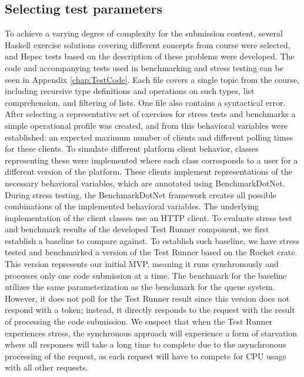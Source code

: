 \subsection{Selecting test parameters}
To achieve a varying degree of complexity for the submission content, several Haskell exercise solutions covering different concepts from course were selected, and Hspec tests based on the description of these problems were developed. 
The code and accompanying tests used in benchmarking and stress testing can be seen in Appendix \ref{chap:TestCode}.
Each file covers a single topic from the course, including recursive type definitions and operations on such types, list comprehension, and filtering of lists. 
One file also contains a syntactical error.
After selecting a representative set of exercises for stress tests and benchmarks a simple operational profile was created, and from this behavioral variables were established: an expected maximum number of clients and different polling times for these clients.
To simulate different platform client behavior, classes representing these were implemented where each class corresponds to a user for a different version of the platform.
These clients implement representations of the necessary behavioral variables, which are annotated using BenchmarkDotNet.
During stress testing, the BenchmarkDotNet framework creates all possible combinations of the implemented behavioral variables.
The underlying implementation of the client classes use an HTTP client.
To evaluate stress test and benchmark results of the developed Test Runner component, we first establish a baseline to compare against.
To establish such baseline, we have stress tested and benchmarked a version of the Test Runner based on the Rocket crate.
This version represents our initial MVP, meaning it runs synchronously and processes only one code submission at a time.
The benchmark for the baseline utilizes the same parameterization as the benchmark for the queue system.
However, it does not poll for the Test Runner result since this version does not respond with a token; instead, it directly responds to the request with the result of processing the code submission.
We suspect that when the Test Runner experiences stress, the synchronous approach will experience a form of starvation where all responses will take a long time to complete due to the asynchronous processing of the request, as each request will have to compete for CPU usage with all other requests.

